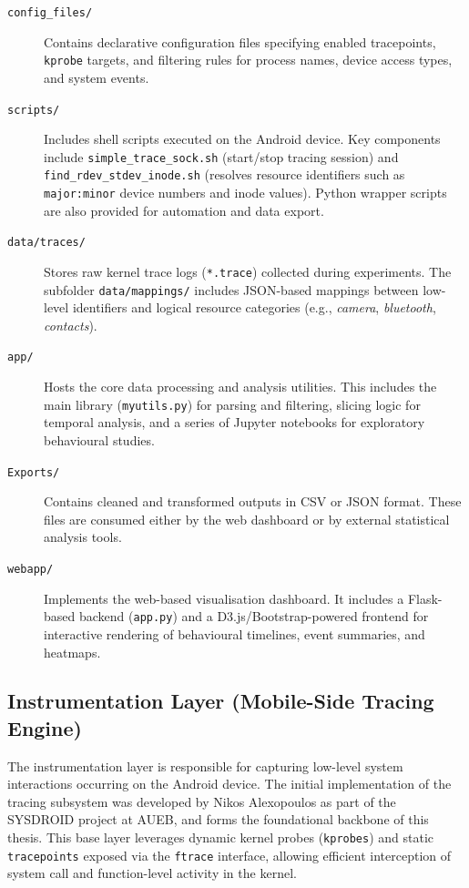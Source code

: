 \documentclass[a4paper,12pt]{report}
\begin{document}
\begin{description}
  \item[\texttt{config\_files/}] Contains declarative configuration files specifying enabled tracepoints, \texttt{kprobe} targets, and filtering rules for process names, device access types, and system events.

  \item[\texttt{scripts/}] Includes shell scripts executed on the Android device. Key components include \texttt{simple\_trace\_sock.sh} (start/stop tracing session) and \texttt{find\_rdev\_stdev\_inode.sh} (resolves resource identifiers such as \texttt{major:minor} device numbers and inode values). Python wrapper scripts are also provided for automation and data export.

  \item[\texttt{data/traces/}] Stores raw kernel trace logs (\texttt{*.trace}) collected during experiments. The subfolder \texttt{data/mappings/} includes JSON-based mappings between low-level identifiers and logical resource categories (e.g., \emph{camera}, \emph{bluetooth}, \emph{contacts}).

  \item[\texttt{app/}] Hosts the core data processing and analysis utilities. This includes the main library (\texttt{myutils.py}) for parsing and filtering, slicing logic for temporal analysis, and a series of Jupyter notebooks for exploratory behavioural studies.

  \item[\texttt{Exports/}] Contains cleaned and transformed outputs in CSV or JSON format. These files are consumed either by the web dashboard or by external statistical analysis tools.

  \item[\texttt{webapp/}] Implements the web-based visualisation dashboard. It includes a Flask-based backend (\texttt{app.py}) and a D3.js/Bootstrap-powered frontend for interactive rendering of behavioural timelines, event summaries, and heatmaps.
\end{description}


\subsection{Instrumentation Layer (Mobile-Side Tracing Engine)}

The instrumentation layer is responsible for capturing low-level system interactions occurring on the Android device. The initial implementation of the tracing subsystem was developed by Nikos Alexopoulos as part of the SYSDROID project at AUEB, and forms the foundational backbone of this thesis. This base layer leverages dynamic kernel probes (\texttt{kprobes}) and static \texttt{tracepoints} exposed via the \texttt{ftrace} interface, allowing efficient interception of system call and function-level activity in the kernel.
\end{document}
